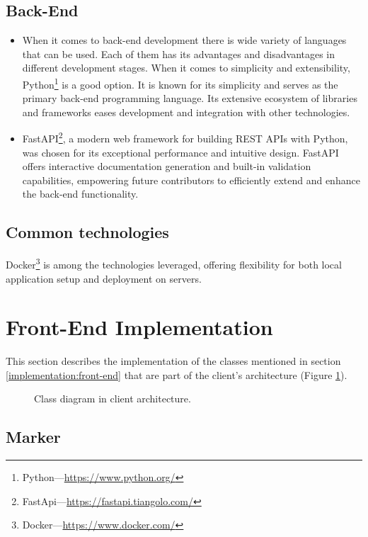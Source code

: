 \subsection{Back-End}

\begin{itemize}
    \item When it comes to back-end development there is wide variety of languages that can be used. Each of them has its advantages and disadvantages in different development stages. When it comes to simplicity and extensibility, Python\footnote{Python---\url{https://www.python.org/}} is a good option. It is known for its simplicity and serves as the primary back-end programming language. Its extensive ecosystem of libraries and frameworks eases development and integration with other technologies.
    \item FastAPI\footnote{FastApi---\url{https://fastapi.tiangolo.com/}}, a modern web framework for building REST APIs with Python, was chosen for its exceptional performance and intuitive design. FastAPI offers interactive documentation generation and built-in validation capabilities, empowering future contributors to efficiently extend and enhance the back-end functionality.
\end{itemize}

\subsection{Common technologies}

Docker\footnote{Docker---\url{https://www.docker.com/}} is among the technologies leveraged, offering flexibility for both local application setup and deployment on servers.

\section{Front-End Implementation}
This section describes the implementation of the classes mentioned in section \ref{implementation:front-end} that are part of the client's architecture (Figure \ref{fig:clientArchitecture}).

\begin{figure}[ht]\centering
  \centering
  
  \caption{Class diagram in client architecture.}
  \label{fig:clientArchitecture}
\end{figure}

\subsection{Marker}

